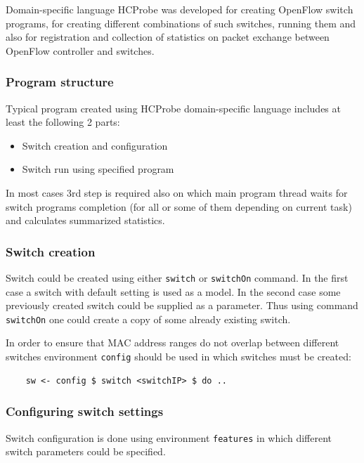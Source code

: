 \documentclass[9pt,a4paper]{article}
\begin{document}
Domain-specific language HCProbe was developed for creating OpenFlow
switch programs, for creating different combinations of such switches,
running them and also for registration and collection of statistics on
packet exchange between OpenFlow controller and switches.

\subsubsection{Program structure}

Typical program created using HCProbe domain-specific language
includes at least the following 2 parts:

\begin{itemize}
  \item Switch creation and configuration
  \item Switch run using specified program
\end{itemize}

In most cases 3rd step is required also on which main program thread
waits for switch programs completion (for all or some of them
depending on current task) and calculates summarized statistics.

\subsubsection{Switch creation}

Switch could be created using either \lstinline!switch! or
\lstinline!switchOn! command.  In the first case a switch with default
setting is used as a model. In the second case some previously created
switch could be supplied as a parameter. Thus using command
\lstinline!switchOn! one could create a copy of some already existing
switch.

In order to ensure that MAC address ranges do not overlap between
different switches environment \lstinline!config! should be used in
which switches must be created:

\begin{lstlisting}
    sw <- config $ switch <switchIP> $ do ..
\end{lstlisting}%

\subsubsection{Configuring switch settings}

Switch configuration is done using environment \lstinline!features! in
which different switch parameters could be specified.
\end{document}
